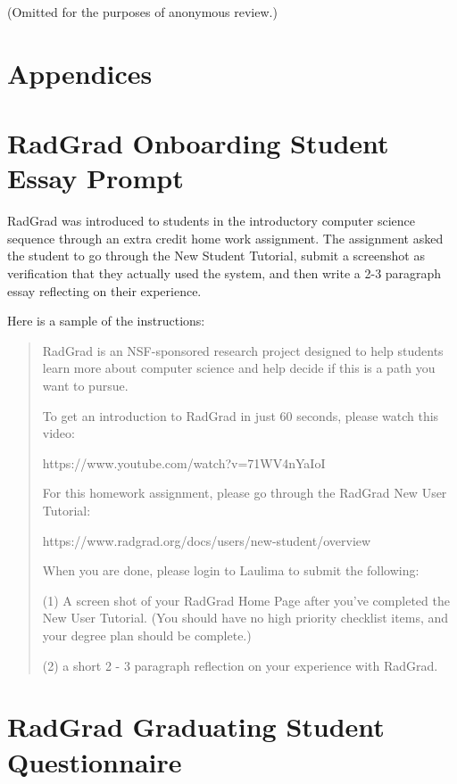 \documentclass[acmsmall,nonacm]{acmart}
\begin{document}
(Omitted for the purposes of anonymous review.)

\section{Appendices}

\appendix

\section{RadGrad Onboarding Student Essay Prompt}
\label{sec:onboarding-student-essay-prompt}

RadGrad was introduced to students in the introductory computer science sequence through an extra credit home work assignment. The assignment asked the student to go through the New Student Tutorial, submit a screenshot as verification that they actually used the system, and then write a 2-3 paragraph essay reflecting on their experience.

Here is a sample of the instructions:

\begin{quotation}
RadGrad is an NSF-sponsored research project designed to help students learn more about computer science and help decide if this is a path you want to pursue.

\medskip

\noindent To get an introduction to RadGrad in just 60 seconds, please watch this video:

https://www.youtube.com/watch?v=71WV4nYaIoI

\medskip

\noindent For this homework assignment, please go through the RadGrad New User Tutorial:

https://www.radgrad.org/docs/users/new-student/overview

\medskip

\noindent When you are done, please login to Laulima to submit the following:

(1) A screen shot of your RadGrad Home Page after you’ve completed the New User Tutorial. (You should have no high priority checklist items, and your degree plan should be complete.)

(2) a short 2 - 3 paragraph reflection on your experience with RadGrad.
\end{quotation}


\section{RadGrad Graduating Student Questionnaire}
\label{sec:graduating-student-questionnaire}
\end{document}

